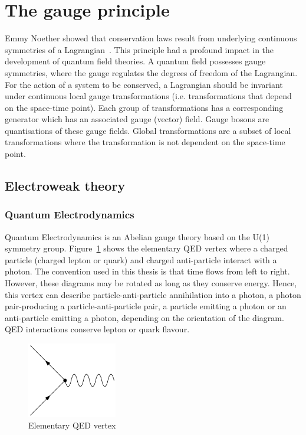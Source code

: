 \section{The gauge principle}
Emmy Noether showed that conservation laws result from underlying continuous symmetries of a Lagrangian~\cite{Emmy}. This principle had a profound impact in the development of quantum field theories. A quantum field possesses gauge symmetries, where the gauge regulates the degrees of freedom of the Lagrangian. For the action of a system to be conserved, a Lagrangian should be invariant under continuous local gauge transformations (i.e. transformations that depend on the space-time point). Each group of transformations has a corresponding generator which has an associated gauge (vector) field. Gauge bosons are quantisations of these gauge fields. Global transformations are a subset of local transformations where the transformation is not dependent on the space-time point.

\subsection{Electroweak theory}

\subsubsection{Quantum Electrodynamics}
\label{subsec:QED}

Quantum Electrodynamics is an Abelian gauge theory based on the U(1) symmetry group. Figure~\ref{fig:QEDvertex} shows the elementary QED vertex where a charged particle (charged lepton or quark) and charged anti-particle interact with a photon. The convention used in this thesis is that time flows from left to right. However, these diagrams may be rotated as long as they conserve energy. Hence, this vertex can describe particle-anti-particle annihilation into a photon, a photon pair-producing a particle-anti-particle pair, a particle emitting a photon or an anti-particle emitting a photon, depending on the orientation of the diagram. QED interactions conserve lepton or quark flavour.


\begin{figure}[ht!]
\begin{center}
    \includegraphics[width=0.35\textwidth]{images/Theory/QEDvertex.png}
    \caption{Elementary QED vertex}
    \label{fig:QEDvertex}
\end{center}
\end{figure}

